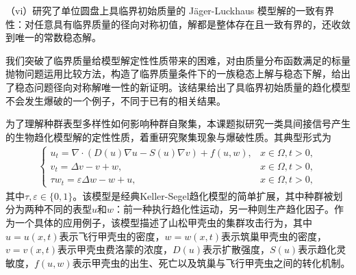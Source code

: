 \documentclass[12pt]{article}
\begin{document}
（vi）研究了单位圆盘上具临界初始质量的 J\"ager-Luckhaus 模型解的一致有界性：对任意具有临界质量的径向对称初值，解都是整体存在且一致有界的，还收敛到唯一的常数稳态解。

我们突破了临界质量给模型解定性性质带来的困难，对由质量分布函数满足的标量抛物问题运用比较方法，构造了临界质量条件下的一族稳态上解与稳态下解，给出了稳态问题径向对称解唯一性的新证明。该结果给出了具临界初始质量的趋化模型不会发生爆破的一个例子，不同于已有的相关结果。





为了理解种群表型多样性如何影响种群自聚集，本课题拟研究一类具间接信号产生的生物趋化模型解的定性性质，着重研究聚集现象与爆破性质。其典型形式为
\begin{align}
    \begin{cases}
      \label{sys: ks isp pppf}
        u_t =  \nabla\cdot(D(u)\nabla u - S(u)\nabla v) + f(u,w),& x\in\Omega, t>0,\\
        v_t =  \Delta v - v + w,& x\in\Omega,	 t>0,\\
        \tau w_t  = \varepsilon\Delta w - w + u, & x\in\Omega, t > 0, 
    \end{cases}
\end{align}
其中$\tau,\varepsilon\in\{0,1\}$。该模型是经典Keller-Segel趋化模型的简单扩展，其中种群被划分为两种不同的表型$u$和$w$：前一种执行趋化性运动，另一种则生产趋化因子。作为一个具体的应用例子，该模型描述了山松甲壳虫的集群攻击行为，其中$u=u(x,t)$表示飞行甲壳虫的密度，$w=w(x,t)$表示筑巢甲壳虫的密度，$v=v(x,t)$表示甲壳虫费洛蒙的浓度，$D(u)$表示扩散强度，$S(u)$表示趋化灵敏度，$f(u,w)$表示甲壳虫的出生、死亡以及筑巢与飞行甲壳虫之间的转化机制。
\end{document}
